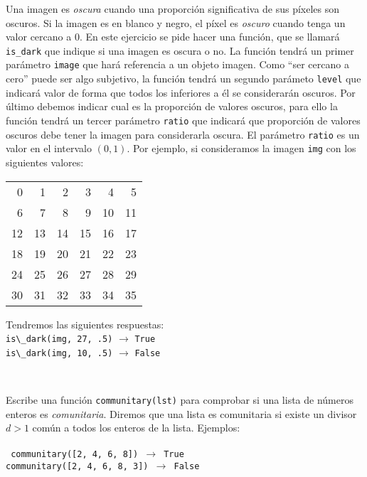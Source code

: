 \documentclass[10pt]{examdesign}
\begin{document}
\begin{shortanswer}
\begin{question}[2 pt]
  Una imagen es \emph{oscura} cuando una proporción significativa de sus
  píxeles son oscuros. 
  Si la imagen es en blanco y negro, el píxel es
  \emph{oscuro} cuando tenga un valor cercano a 0. En este ejercicio se
  pide hacer una función, que se llamará \lstinline{is_dark} 
  que indique si una imagen es oscura o no.
  La función tendrá un primer parámetro \lstinline{image} que hará
  referencia a un objeto imagen. Como ``ser cercano a cero''
  puede ser algo subjetivo, la función tendrá un segundo parámeto
  \lstinline{level} que indicará valor de forma que todos los
  inferiores a él se considerarán oscuros. Por último debemos indicar
  cual es la proporción de valores oscuros, para ello la función tendrá
  un tercer parámetro \lstinline{ratio} que indicará que proporción de
  valores oscuros debe tener la imagen para considerarla oscura. El
  parámetro \lstinline{ratio} es un valor en el intervalo $(0,1)$. Por
  ejemplo, si consideramos la imagen \lstinline{img} con los siguientes valores:
  \begin{center}
    \begin{tabular}{*{6}{r}}
      0 &   1 &   2 &   3 &   4 &   5 \\
      6 &   7 &   8 &   9 &  10 &  11 \\
      12 &  13 &  14 &  15 &  16 &  17 \\
      18 &  19 &  20 &  21 &  22 &  23 \\
      24 &  25 &  26 &  27 &  28 &  29 \\
      30 &  31 &  32 &  33 &  34 &  35 \\
    \end{tabular}
  \end{center}
  Tendremos las siguientes respuestas:\\
  \lstinline{is\_dark(img, 27, .5)} $\to$  \lstinline{True}\\
  \lstinline{is\_dark(img, 10, .5)} $\to$ \lstinline{False} \\
  \begin{answer}
  ~
  
  \end{answer}
\end{question}
  
\begin{question}[2 pt]
  Escribe una función \lstinline{communitary(lst)} para comprobar si una lista de 
  números enteros es \emph{comunitaria}. Diremos que una lista es 
  comunitaria si existe un divisor $d > 1$ común a todos
  los enteros de la lista. Ejemplos:\\[-.2cm]
   ~\\
    \texttt{
    communitary([2, 4, 6, 8]) $\to$ True \\
    communitary([2, 4, 6, 8, 3]) $\to$ False
    }


  \begin{answer}
  ~
  \end{answer}  
  \end{question}  
\end{shortanswer}
\end{document}
